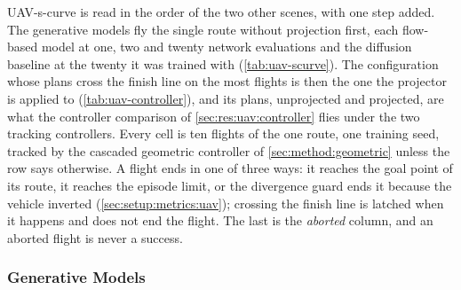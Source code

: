 UAV-s-curve is read in the order of the two other scenes, with one step added. The generative models
fly the single route without projection first, each flow-based model at one, two and twenty network
evaluations and the diffusion baseline at the twenty it was trained with (\autoref{tab:uav-scurve}). The
configuration whose plans cross the finish line on the most flights is then the one the projector is
applied to (\autoref{tab:uav-controller}), and its plans, unprojected and projected, are what the
controller comparison of \autoref{sec:res:uav:controller} flies under the two tracking controllers.
Every cell is ten flights of the one route, one training seed, tracked by the cascaded geometric
controller of \autoref{sec:method:geometric} unless the row says otherwise. A flight ends in one of
three ways: it reaches the goal point of its route, it reaches the episode limit, or the divergence guard
ends it because the vehicle inverted (\autoref{sec:setup:metrics:uav}); crossing the finish line is latched
when it happens and does not end the flight. The last is the \emph{aborted} column,
and an aborted flight is never a success.

\subsubsection{Generative Models}\label{sec:res:uav:scurve:models}

